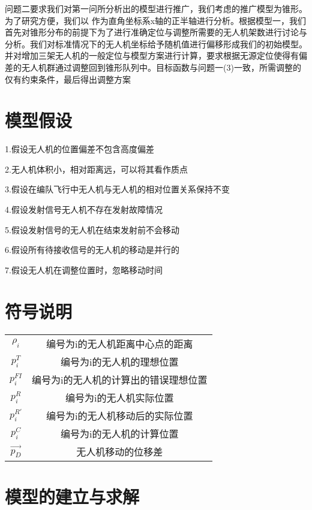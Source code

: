 \documentclass{cumcmthesis}
\begin{document}
问题二要求我们对第一问所分析出的模型进行推广，我们考虑的推广模型为锥形。为了研究方便，我们以 作为直角坐标系x轴的正半轴进行分析。根据模型一，我们首先对锥形分布的前提下为了进行准确定位与调整所需要的无人机架数进行讨论与分析。我们对标准情况下的无人机坐标给予随机值进行偏移形成我们的初始模型。并对增加三架无人机的一般定位与模型方案进行计算，要求根据无源定位使得有偏差的无人机群通过调整回到锥形队列中。目标函数与问题一(3)一致，所需调整的仅有约束条件，最后得出调整方案
\section{模型假设}
1.假设无人机的位置偏差不包含高度偏差

2.无人机体积小，相对距离远，可以将其看作质点

3.假设在编队飞行中无人机与无人机的相对位置关系保持不变

4.假设发射信号无人机不存在发射故障情况

5.假设发射信号的无人机在结束发射前不会移动

6.假设所有待接收信号的无人机的移动是并行的

7.假设无人机在调整位置时，忽略移动时间
\section{符号说明}
\begin{center}
	\begin{tabular}{cc}
		\toprule[1.5pt]
		\makebox[0.3\textwidth][c]{符号}	&  \makebox[0.4\textwidth][c]{意义} \\ \hline
		$\rho_i$	    & 编号为i的无人机距离中心点的距离 \\ \hline
		$p_i^T$	    & 编号为i的无人机的理想位置 \\ \hline
		$p_i^{FI}$	    & 编号为i的无人机的计算出的错误理想位置 \\ \hline
		$p_i^R$	    & 编号为i的无人机实际位置 \\ \hline
		$p_i^{R'}$	    & 编号为i的无人机移动后的实际位置 \\ \hline
		$p_i^C$	    & 编号为i的无人机的计算位置 \\ \hline
		$\vec{p_D}$ & 无人机移动的位移差\\ 
		 \bottomrule[1.5pt]
	\end{tabular}
\end{center}

\section{模型的建立与求解}
\end{document}
